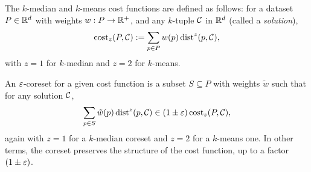 The $k$-median and $k$-means cost functions are defined as follows: 
for a dataset $P \in \mathbb{R}^d$ with weights $w : P \rightarrow \mathbb{R}^+$, and any $k$-tuple $\mathcal C$ in $\mathbb{R}^d$ (called a \emph{solution}), 
\[\operatorname{cost}_z(P, \mathcal C) := \sum_{p \in P} w(p) \operatorname{dist}^z(p, \mathcal C),\]
with $z=1$ for $k$-median and $z=2$ for $k$-means.

An $\varepsilon$-coreset for a given cost function is a subset $S \subseteq P$ with weights $\tilde w$ such that
for any solution $\mathcal C$,
\[\sum_{p \in S} \tilde w(p) \operatorname{dist}^z(p, \mathcal C) \in (1 \pm \varepsilon) \operatorname{cost}_z(P, \mathcal C),\]
again with $z=1$ for a $k$-median coreset and $z=2$ for a $k$-means one.
In other terms, the coreset preserves the structure of the cost function, up to a factor $(1\pm \varepsilon)$.



%
%

